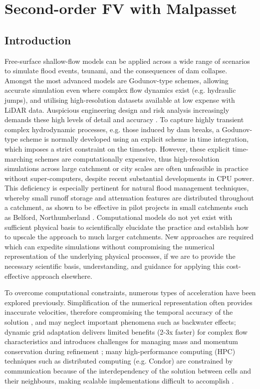 \chapter{Second-order FV with Malpasset}

\section{Introduction}

Free-surface shallow-flow models can be applied across a wide range of scenarios to simulate flood events, tsunami, and the consequences of dam collapse. Amongst the most advanced models are Godunov-type schemes, allowing accurate simulation even where complex flow dynamics exist (e.g. hydraulic jumps), and utilising high-resolution datasets available at low expense with LiDAR data. Auspicious engineering design and risk analysis increasingly demands these high levels of detail and accuracy \citep{French2003,Haile2005,Marks2000}. To capture highly transient complex hydrodynamic processes, e.g. those induced by dam breaks, a Godunov-type scheme is normally developed using an explicit scheme in time integration, which imposes a strict constraint on the timestep. However, these explicit time-marching schemes are computationally expensive, thus high-resolution simulations across large catchment or city scales are often unfeasible in practice without super-computers, despite recent substantial developments in CPU power. This deficiency is especially pertinent for natural flood management techniques, whereby small runoff storage and attenuation features are distributed throughout a catchment, as shown to be effective in pilot projects in small catchments such as Belford, Northumberland \citep{EnvironmentAgency2012,Wilkinson2010}. Computational models do not yet exist with sufficient physical basis to scientifically elucidate the practice and establish how to upscale the approach to much larger catchments. New approaches are required which can expedite simulations without compromising the numerical representation of the underlying physical processes, if we are to provide the necessary scientific basis, understanding, and guidance for applying this cost-effective approach elsewhere. 

To overcome computational constraints, numerous types of acceleration have been explored previously. Simplification of the numerical representation often provides inaccurate velocities, therefore compromising the temporal accuracy of the solution \citep{Pender2010,Singh1996,Neelz2009}, and may neglect important phenomena such as backwater effects; dynamic grid adaptation delivers limited benefits (2-3x faster) for complex flow characteristics and introduces challenges for managing mass and momentum conservation during refinement \citep{Liang2004}; many high-performance computing (HPC) techniques such as distributed computing (e.g. Condor) are constrained by communication because of the interdependency of the solution between cells and their neighbours, making scalable implementations difficult to accomplish \citep{Pau2006,Delis2009}. 


